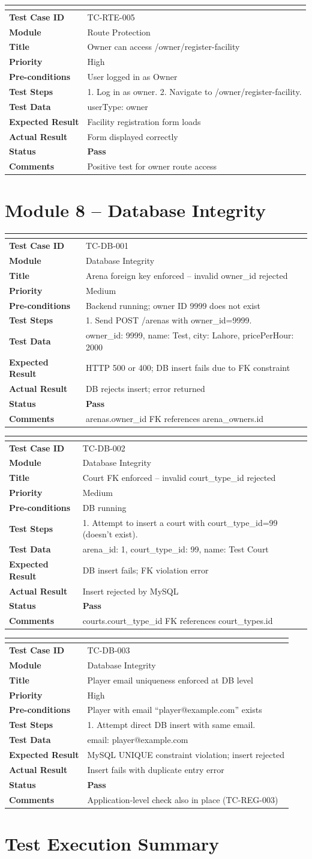 \documentclass[12pt,a4paper]{article}
\newcommand{\pass}{\textcolor{passgreen}{\textbf{Pass}}}
\newcommand{\testcase}[9]{%
\renewcommand{\arraystretch}{1.3}
\noindent\begin{tabularx}{\textwidth}{|>{\bfseries\small}p{3.5cm}|>{\small}X|}
\hline
\rowcolor{headerbg}\multicolumn{2}{|l|}{\color{white}\bfseries\small #1 -- #3}\\
\hline
Test Case ID    & #1 \\ \hline
\rowcolor{rowgray}
Module          & #2 \\ \hline
Title           & #3 \\ \hline
\rowcolor{rowgray}
Priority        & #4 \\ \hline
Pre-conditions  & #5 \\ \hline
\rowcolor{rowgray}
Test Steps      & #6 \\ \hline
Test Data       & #7 \\ \hline
\rowcolor{rowgray}
Expected Result & #8 \\ \hline
#9
\end{tabularx}
\vspace{0.7em}
}
\newcommand{\tcactual}[1]{Actual Result & #1 \\ \hline \rowcolor{rowgray}}
\newcommand{\tcstatus}[1]{Status & #1 \\ \hline}
\newcommand{\tccomment}[1]{Comments & #1 \\ \hline}
\begin{document}
\testcase
  {TC-RTE-005}{Route Protection}{Owner can access /owner/register-facility}
  {High}
  {User logged in as Owner}
  {1. Log in as owner. 2. Navigate to /owner/register-facility.}
  {userType: owner}
  {Facility registration form loads}
  {\tcactual{Form displayed correctly}\tcstatus{\pass}\tccomment{Positive test for owner route access}}

\newpage

\section{Module 8 -- Database Integrity}

\testcase
  {TC-DB-001}{Database Integrity}{Arena foreign key enforced -- invalid owner\_id rejected}
  {Medium}
  {Backend running; owner ID 9999 does not exist}
  {1. Send POST /arenas with owner\_id=9999.}
  {owner\_id: 9999, name: Test, city: Lahore, pricePerHour: 2000}
  {HTTP 500 or 400; DB insert fails due to FK constraint}
  {\tcactual{DB rejects insert; error returned}\tcstatus{\pass}\tccomment{arenas.owner\_id FK references arena\_owners.id}}

\testcase
  {TC-DB-002}{Database Integrity}{Court FK enforced -- invalid court\_type\_id rejected}
  {Medium}
  {DB running}
  {1. Attempt to insert a court with court\_type\_id=99 (doesn't exist).}
  {arena\_id: 1, court\_type\_id: 99, name: Test Court}
  {DB insert fails; FK violation error}
  {\tcactual{Insert rejected by MySQL}\tcstatus{\pass}\tccomment{courts.court\_type\_id FK references court\_types.id}}

\testcase
  {TC-DB-003}{Database Integrity}{Player email uniqueness enforced at DB level}
  {High}
  {Player with email ``player@example.com'' exists}
  {1. Attempt direct DB insert with same email.}
  {email: player@example.com}
  {MySQL UNIQUE constraint violation; insert rejected}
  {\tcactual{Insert fails with duplicate entry error}\tcstatus{\pass}\tccomment{Application-level check also in place (TC-REG-003)}}

\newpage

\section{Test Execution Summary}
\end{document}
